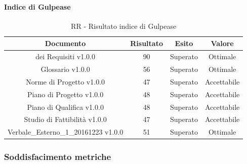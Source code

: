 \paragraph{Indice di Gulpease}

\begin{table}[h]
	\begin{center}
		\begin{tabular}{|c|c|c|c|}
			\hline
			\textbf{Documento}	& \textbf{Risultato} & \textbf{Esito} & \textbf{Valore} \\
			\hline
		 \termine{Analisi} dei Requisiti v1.0.0 & 90 & Superato & Ottimale	\\
			\hline
			Glossario v1.0.0 & 56 & Superato & Ottimale	\\
			\hline
			Norme di Progetto v1.0.0 & 47 & Superato & Accettabile \\
			\hline
			Piano di Progetto v1.0.0 & 48 & Superato & Accettabile\\
			\hline
			Piano di Qualifica v1.0.0	& 48 & Superato & Accettabile\\
			\hline
			Studio di Fattibilità v1.0.0	& 47 & Superato & Accettabile\\
			\hline
			Verbale\_Esterno\_1\_20161223 v1.0.0	& 51 & Superato & Ottimale	\\
			\hline
		\end{tabular}
	\end{center}
	\caption{RR - Risultato indice di Gulpease}
\end{table}

\subsubsection{Soddisfacimento metriche}

